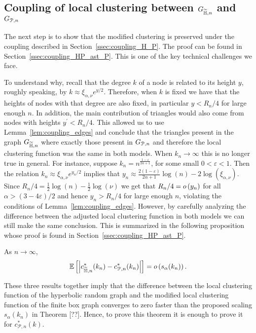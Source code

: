 \subsection{Coupling of local clustering between $G_{\widetilde{\mathbb{H}},n}$ and $G_{{\mathcal P},n}$}

The next step is to show that the modified clustering is preserved under the coupling described in Section~\ref{ssec:coupling_H_P}. The proof can be found in Section~\ref{ssec:coupling_HP_ast_P}. This is one of the key technical challenges we face. 

To understand why, recall that the degree $k$ of a node is related to its height $y$, roughly speaking, by $k \approx \xi_{\alpha, \nu} e^{y/2}$. Therefore, when $k$ is fixed we have that the heights of nodes with that degree are also fixed, in particular $y < R_n/4$ for large enough $n$. In addition, the main contribution of triangles would also come from nodes with heights $y^\prime < R_n/4$. This allowed us to use Lemma~\ref{lem:coupling_edges} and conclude that the triangles present in the graph $G_{\widetilde{\mathbb{H}},n}$ where exactly those present in $G_{{\mathcal P},n}$ and therefore the local clustering function was the same in both models. When $k_n \to \infty$ this is no longer true in general. For instance, suppose $k_n = n^{\frac{1-\varepsilon}{2\alpha + 1}}$, for some small $0 < \varepsilon < 1$. Then the relation $k_n \approx \xi_{\alpha, \nu} e^{y_n/2}$ implies that $y_n \approx \frac{2(1-\varepsilon)}{2\alpha + 1}\log(n) - 2\log(\xi_{\alpha, \nu})$. Since
$R_n/4 = \frac{1}{2}\log(n) - \frac{1}{2}\log(\nu)$ we get that $R_n/4 = o\left(y_n\right)$ for all $\alpha > (3 - 4\varepsilon)/2$ and hence $y_n > R_n/4$ for large enough $n$, violating the conditions of Lemma~\ref{lem:coupling_edges}. However, by carefully analyzing the difference between the adjusted local clustering function in both models we can still make the same conclusion. This is summarized in the following proposition whose proof is found in Section~\ref{ssec:coupling_HP_ast_P}.

\begin{proposition}\label{prop:couling_c_H_P}
As $n \to \infty$,
\[
	\mathbb{E}\left[\left|c_{\widetilde{\mathbb{H}},n}^\ast(k_n) - c_{{\mathcal P},n}^\ast(k_n)\right|\right] = o\left(s_\alpha(k_n)\right).
\]
\end{proposition}

These three results together imply that the difference between the local clustering function of the hyperbolic random graph and the modified local clustering function of the finite box graph converges to zero faster than the proposed scaling $s_\alpha(k_n)$ in Theorem [??]. Hence, to prove this theorem it is enough to prove it for $c_{\mathcal{P},n}^\ast(k)$. 

